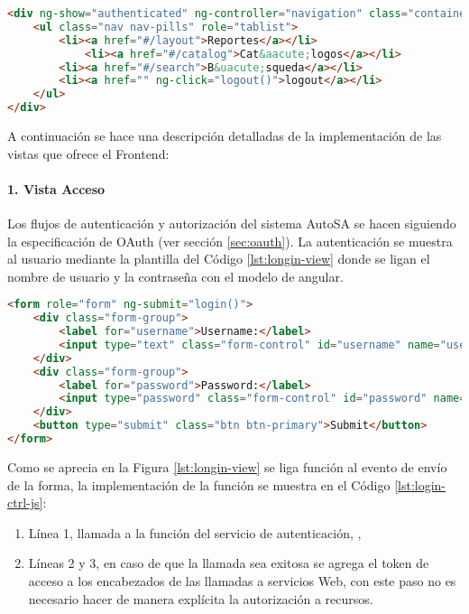 \begin{lstlisting}[language=HTML, captionpos=b, caption={Barra de navegación}, label={lst:view-nav-bar}]
<div ng-show="authenticated" ng-controller="navigation" class="container">
	<ul class="nav nav-pills" role="tablist">
		<li><a href="#/layout">Reportes</a></li>
			<li><a href="#/catalog">Cat&aacute;logos</a></li> 
		<li><a href="#/search">B&uacute;squeda</a></li>
		<li><a href="" ng-click="logout()">logout</a></li>
	</ul>
</div>
\end{lstlisting}

A continuación se hace una descripción detalladas de la implementación de las vistas que ofrece el Frontend:

\paragraph{1. Vista Acceso\\}
Los flujos de autenticación y autorización del sistema AutoSA se hacen siguiendo la especificación de OAuth (ver sección \ref{sec:oauth}). La autenticación se muestra al usuario mediante la plantilla del Código \ref{lst:longin-view} donde se ligan el nombre de usuario y la contraseña con el modelo de angular.

\begin{lstlisting}[language=HTML, caption={Plantilla HTML de acceso.}, captionpos=b, label={lst:longin-view}]
<form role="form" ng-submit="login()">
	<div class="form-group">
		<label for="username">Username:</label>
		<input type="text" class="form-control" id="username" name="username" ng-model="credentials.username"/>
	</div>
	<div class="form-group">
		<label for="password">Password:</label>
		<input type="password" class="form-control" id="password" name="password" ng-model="credentials.password"/>
	</div>
	<button type="submit" class="btn btn-primary">Submit</button>
</form>
\end{lstlisting}


Como se aprecia en la Figura \ref{lst:longin-view} se liga función  al evento de envío de la forma, la implementación de la función se muestra en el Código \ref{lst:login-ctrl-js}:
\begin{enumerate}
	\item Línea 1, llamada a la función  del servicio de autenticación, ,
	\item Líneas 2 y 3, en caso de que la llamada sea exitosa se agrega el token de acceso a los encabezados de las llamadas a servicios Web, con este paso no es necesario hacer de manera explícita la autorización a recursos.
\end{enumerate}

